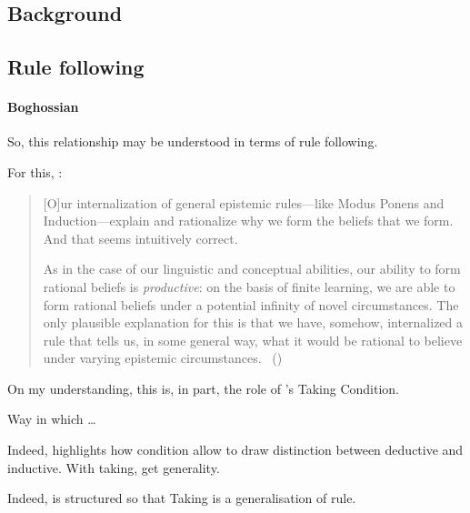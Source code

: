 \subsection{Background}
\label{sec:background}

\subsection{Rule following}

\paragraph{Boghossian}

\begin{note}
  So, this relationship may be understood in terms of rule following.

  For this, \citeauthor{Boghossian:2008vf}:

  \begin{quote}
    [O]ur internalization of general epistemic rules---like Modus Ponens and Induction---explain and rationalize why we form the beliefs that we form.
    And that seems intuitively correct.

    As in the case of our linguistic and conceptual abilities, our ability to form rational beliefs is \emph{productive}: on the basis of finite learning, we are able to form rational beliefs under a potential infinity of novel circumstances.
    The only plausible explanation for this is that we have, somehow, internalized a rule that tells us, in some general way, what it would be rational to believe under varying epistemic circumstances.%
    \mbox{ }\hfill\mbox{(\citeyear[483]{Boghossian:2008vf})}
  \end{quote}
\end{note}

\begin{note}
  On my understanding, this is, in part, the role of \citeauthor{Boghossian:2014aa}'s Taking Condition.

  Way in which \dots

  Indeed, \citeauthor{Boghossian:2014aa} highlights how condition allow to draw distinction between deductive and inductive.
  With taking, get generality.

  Indeed, \textcite{Boghossian:2014aa} is structured so that Taking is a generalisation of rule.
\end{note}

